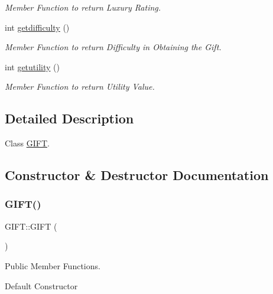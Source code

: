 \begin{DoxyCompactItemize}
\begin{DoxyCompactList}\small\item\em Member Function to return Luxury Rating. \end{DoxyCompactList}\item 
int \hyperlink{class_g_i_f_t_a9b63acd1d421404203f852d0db61e60e}{getdifficulty} ()
\begin{DoxyCompactList}\small\item\em Member Function to return Difficulty in Obtaining the Gift. \end{DoxyCompactList}\item 
int \hyperlink{class_g_i_f_t_abebe17aa357b6b91b1893c54030b3fe2}{getutility} ()
\begin{DoxyCompactList}\small\item\em Member Function to return Utility Value. \end{DoxyCompactList}\end{DoxyCompactItemize}


\subsection{Detailed Description}
Class \hyperlink{class_g_i_f_t}{G\+I\+FT}. 

\subsection{Constructor \& Destructor Documentation}
\mbox{\label{class_g_i_f_t_a7ffd64aabe995e6fa927cef8dd874505}} 
\subsubsection{\texorpdfstring{G\+I\+F\+T()}{GIFT()}\hspace{0.1cm}{\footnotesize\ttfamily [1/2]}}
{\footnotesize\ttfamily G\+I\+F\+T\+::\+G\+I\+FT (\begin{DoxyParamCaption}{ }\end{DoxyParamCaption})}



Public Member Functions. 

Default Constructor \mbox{\label{class_g_i_f_t_aaeda596c19a7738a83bf3046613b0eab}} 
